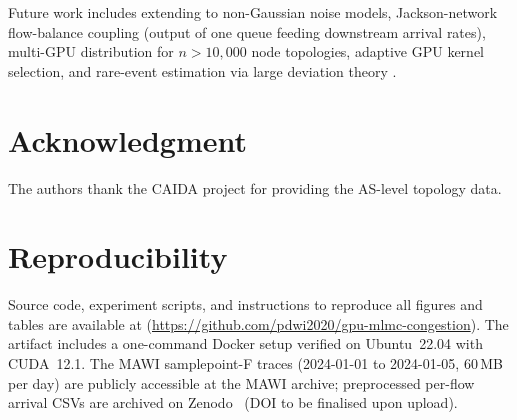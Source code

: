 \documentclass{ieeeaccess}
\begin{document}
Future work includes extending to non-Gaussian noise models, Jackson-network flow-balance
coupling (output of one queue feeding downstream arrival rates), multi-GPU distribution for
$n > 10{,}000$ node topologies, adaptive GPU kernel selection, and rare-event estimation via
large deviation theory \cite{chatterjee2017}.

\section*{Acknowledgment}

The authors thank the CAIDA project for providing the AS-level topology data.

\section*{Reproducibility}
\label{sec:reproducibility}
Source code, experiment scripts, and instructions to reproduce all figures and tables are
available at \cite{gpu_mlmc_code} (\url{https://github.com/pdwi2020/gpu-mlmc-congestion}).
The artifact includes a one-command Docker setup verified on Ubuntu~22.04 with CUDA~12.1.
The MAWI samplepoint-F traces (2024-01-01 to 2024-01-05, 60\,MB per day) are publicly
accessible at the MAWI archive; preprocessed per-flow arrival CSVs are archived on
Zenodo~\cite{mawi2024zenodo} (DOI to be finalised upon upload).


\EOD
\end{document}
